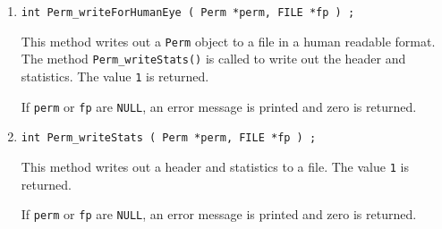 \begin{enumerate}
\item
\begin{verbatim}
int Perm_writeForHumanEye ( Perm *perm, FILE *fp ) ;
\end{verbatim}
\par
This method writes out a {\tt Perm} object to a file in a human
readable format.
The method {\tt Perm\_writeStats()} 
is called to write out the
header and statistics. 
The value {\tt 1} is returned.
\par {}
If {\tt perm} or {\tt fp} are {\tt NULL},
an error message is printed and zero is returned.
\item
\begin{verbatim}
int Perm_writeStats ( Perm *perm, FILE *fp ) ;
\end{verbatim}
\par
This method writes out a header and statistics to a file.
The value {\tt 1} is returned.
\par {}
If {\tt perm} or {\tt fp} are {\tt NULL},
an error message is printed and zero is returned.
\end{enumerate}
